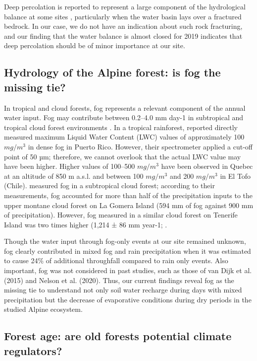 \documentclass[10pt,letterpaper]{article}
\begin{document}
Deep percolation is reported to represent a large component of the hydrological balance at some sites \cite{Amelietal}, particularly when the water basin lays over a fractured bedrock. In our case, we do not have an indication about such rock fracturing, and our finding that the water balance is almost closed for 2019 indicates that deep percolation should be of minor importance at our site. 

\subsection{Hydrology of the Alpine forest: is fog the missing tie?}

In tropical and cloud forests, fog represents a relevant component of the annual water input. Fog may contribute between 0.2–4.0 mm day-1 in subtropical and tropical cloud forest environments \cite{BruijnzeelProctor,e16b77c7c83b4b92b69d38a25a041d1a}. In a tropical rainforest, \cite{HOLWERDA20121} reported directly measured maximum Liquid Water Content (LWC) values of approximately 100 $mg/m^3$ in dense fog in Puerto Rico. However, their spectrometer applied a cut-off point of 50 µm; therefore, we cannot overlook that the actual LWC value may have been higher. Higher values of 100–500 $mg/m^3$ have been observed in Quebec at an altitude of 850 m a.s.l. and between 100 $mg/m^3$ and 200 $mg/m^3$ in El Tofo (Chile). \cite{SantosBruijnzeel2011} measured fog in a subtropical cloud forest; according to their measurements, fog accounted for more than half of the precipitation inputs to the upper montane cloud forest on La Gomera Island (594 mm of fog against 900 mm of precipitation). However, fog measured in a similar cloud forest on Tenerife Island was two times higher (1,214 ± 86 mm year-1; \cite{Marzol}. 

Though the water input through fog-only events at our site remained unknown, fog clearly contributed in mixed fog and rain precipitation when it was estimated to cause 24\% of additional throughfall compared to rain only events. Also important, fog was not considered in past studies, such as those of van Dijk et al. (2015) and Nelson et al. (2020). Thus, our current findings reveal fog as the missing tie to understand not only soil water recharge during days with mixed precipitation but the decrease of evaporative conditions during dry periods in the studied Alpine ecosystem. 

\subsection{Forest age: are old forests potential climate regulators?}
\end{document}
